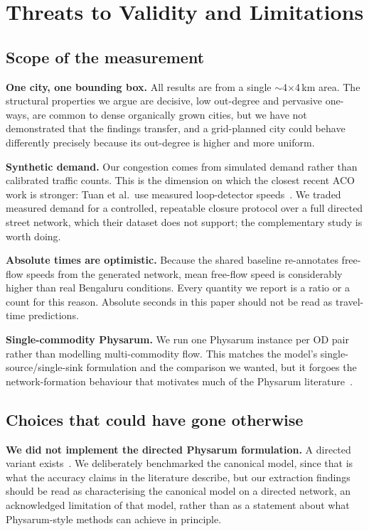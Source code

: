 \section{Threats to Validity and Limitations}
\label{sec:limitations}

\subsection{Scope of the measurement}

\textbf{One city, one bounding box.} All results are from a single
$\sim$4$\times$4\,km area. The structural properties we argue are decisive, low out-degree and
pervasive one-ways, are common to dense organically grown cities, but we have not demonstrated that the findings transfer, and a
grid-planned city could behave differently precisely because its out-degree
is higher and more uniform.

\textbf{Synthetic demand.} Our congestion comes from simulated demand rather
than calibrated traffic counts. This is the dimension on which the closest
recent ACO work is stronger: Tuan et al.\ use measured loop-detector
speeds~\cite{tuan2026improved,li2018diffusion}. We traded measured demand for
a controlled, repeatable closure protocol over a full directed street
network, which their dataset does not support; the complementary study is
worth doing.

\textbf{Absolute times are optimistic.} Because the shared baseline
re-annotates free-flow speeds from the generated network, mean free-flow
speed is considerably higher than real Bengaluru conditions. Every quantity
we report is a ratio or a count for this reason. Absolute seconds in this
paper should not be read as travel-time predictions.

\textbf{Single-commodity Physarum.} We run one Physarum instance per OD pair
rather than modelling multi-commodity flow. This matches the model's
single-source/single-sink formulation and the comparison we wanted, but it
forgoes the network-formation behaviour that motivates much of the Physarum
literature~\cite{tero2010rules}.

\subsection{Choices that could have gone otherwise}

\textbf{We did not implement the directed Physarum formulation.} A directed
variant exists~\cite{zhang2014directed}. We deliberately benchmarked the
canonical model, since that is what the accuracy claims in the literature
describe, but our extraction findings should be read as characterising the canonical model on a directed network, an acknowledged
limitation of that model, rather than as a statement about what Physarum-style methods can
achieve in principle.


